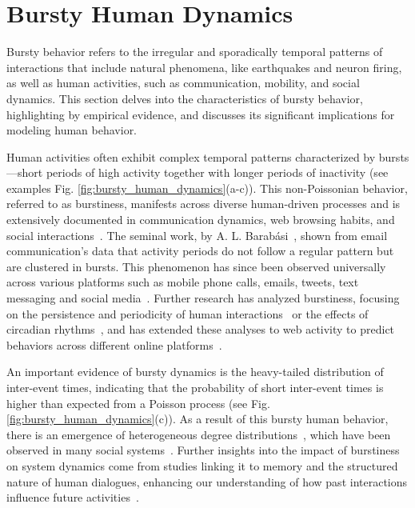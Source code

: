 \section{\label{sec: Bursty Human Dynamics} Bursty Human Dynamics}

Bursty behavior refers to the irregular and sporadically temporal patterns of interactions that include natural phenomena, like earthquakes and neuron firing, as well as human activities, such as communication, mobility, and social dynamics. This section delves into the characteristics of bursty behavior, highlighting by empirical evidence, and discusses its significant implications for modeling human behavior.

Human activities often exhibit complex temporal patterns characterized by bursts---short periods of high activity together with longer periods of inactivity (see examples Fig. \ref{fig:bursty_human_dynamics}(a-c)). This non-Poissonian behavior, referred to as burstiness, manifests across diverse human-driven processes and is extensively documented in communication dynamics, web browsing habits, and social interactions~\cite{Barabasi2005Bursts, Vazquez2006Bursts}. The seminal work, by A. L. Barabási~\cite{Barabasi2005Bursts}, shown from email communication's data that activity periods do not follow a regular pattern but are clustered in bursts. This phenomenon has since been observed universally across various platforms such as mobile phone calls, emails, tweets, text messaging and social media~\cite{karsai-2011, Miritello2013Capacity,artime-2017,rybski-2012,zignani-2016,kumar-2020,iribarren-2009}. Further research has analyzed burstiness, focusing on the persistence and periodicity of human interactions~\cite{Clauset2007Proximity} or the effects of circadian rhythms~\cite{Jo2012Circadian}, and has extended these analyses to web activity to predict behaviors across different online platforms~\cite{Radicchi2009WebActivity}.

An important evidence of bursty dynamics is the heavy-tailed distribution of inter-event times, indicating that the probability of short inter-event times is higher than expected from a Poisson process (see Fig. \ref{fig:bursty_human_dynamics}(c)). As a result of this bursty human behavior, there is an emergence of heterogeneous degree distributions~\cite{Muchnik2013PowerLaw}, which have been observed in many social systems~\cite{barabasi2009scale}. Further insights into the impact of burstiness on system dynamics come from studies linking it to memory and the structured nature of human dialogues, enhancing our understanding of how past interactions influence future activities~\cite{karsai2012universal, Goh2008Burstiness, Eckmann2004Entropy}.

